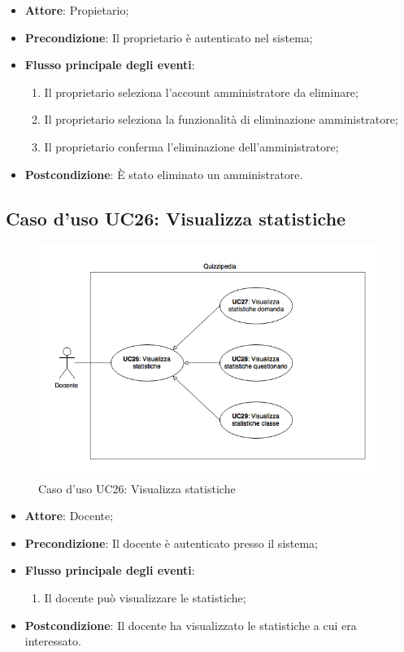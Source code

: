 \documentclass[12pt,a4paper]{article}
\begin{document}
\begin{itemize}

\item \textbf{Attore}: Propietario; 
\item \textbf{Precondizione}: Il proprietario è autenticato nel sistema;

\item \textbf{Flusso principale degli eventi}:
\begin{enumerate}
	\item Il proprietario seleziona l'account amministratore da eliminare;
	\item Il proprietario seleziona la funzionalità di eliminazione amministratore;
	\item Il proprietario conferma l'eliminazione dell'amministratore;
	
\end{enumerate}
\item \textbf{Postcondizione}: È stato eliminato un amministratore.
\end{itemize}
\hypertarget{UC26}{}
\subsection{Caso d'uso UC26: Visualizza statistiche}
\begin{figure}[H]
    \centering
	\includegraphics[width=\textwidth]{../img/diagramUC26.png}
	\caption{Caso d'uso UC26: Visualizza statistiche}\label{fig:UC26} 
\end{figure}
\begin{itemize}

\item \textbf{Attore}: Docente; 
\item \textbf{Precondizione}: Il docente è autenticato presso il sistema;

\item \textbf{Flusso principale degli eventi}:
\begin{enumerate}
	\item Il docente può visualizzare le statistiche;
	
\end{enumerate}
\item \textbf{Postcondizione}: Il docente ha visualizzato le statistiche a cui era interessato.
\end{itemize}
\hypertarget{UC27}{}
\end{document}
